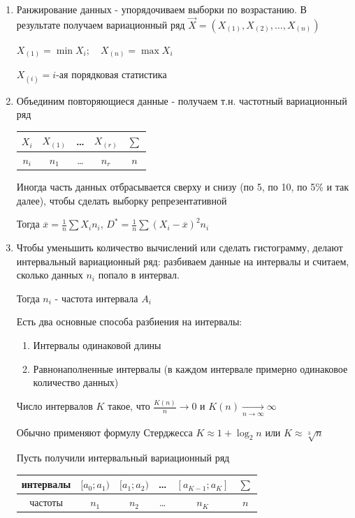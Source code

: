 \documentclass[12pt]{article}
\begin{document}
\begin{enumerate}
    \item Ранжирование данных - упорядочиваем выборки по возрастанию. В результате получаем вариационный ряд $\vec{X} = (X_{(1)}, X_{(2)}, \dots, X_{(n)})$

    $X_{(1)} = \min X_i; \quad X_{(n)} = \max X_i$

    $X_{(i)} = i$-ая порядковая статистика

    \item Объединим повторяющиеся данные - получаем т.н. частотный вариационный ряд

    \begin{tabular}{c|c|c|c|c}
        $X_i$ & $X_{(1)}$ & \dots & $X_{(r)}$ & $\sum$ \\ 
        \hline
        $n_i$ & $n_1$ & \dots & $n_r$ & $n$ \\ 
    \end{tabular}

    Иногда часть данных отбрасывается сверху и снизу (по 5, по 10, по 5\% и так далее), чтобы сделать выборку репрезентативной

    Тогда $\overline{x} = \frac{1}{n} \sum X_i n_i$, $D^* = \frac{1}{n} \sum (X_i - \overline{x})^2 n_i$
    
    \item Чтобы уменьшить количество вычислений или сделать гистограмму, делают интервальный вариационный ряд: 
    разбиваем данные на интервалы и считаем, сколько данных $n_i$ попало в интервал. 

    Тогда $n_i$ - частота интервала $A_i$

    Есть два основные способа разбиения на интервалы: 

    \begin{enumerate}
        \item Интервалы одинаковой длины
        \item Равнонаполненные интервалы (в каждом интервале примерно одинаковое количество данных)
    \end{enumerate}

    Число интервалов $K$ такое, что $\frac{K(n)}{n} \longrightarrow 0$ и $K(n) \underset{n \to \infty}{\longrightarrow} \infty$

    Обычно применяют формулу Стерджесса $K \approx 1 + \log_2 n$ или $K \approx \sqrt[3]{n}$

    Пусть получили интервальный вариационный ряд

    \begin{tabular}{c|c|c|c|c|c}
        интервалы & $[a_0; a_1)$ & $[a_1; a_2)$ & \dots & $[a_{K - 1}; a_K]$ & $\sum$ \\ 
        \hline
        частоты & $n_1$ & $n_2$ & \dots & $n_K$ & $n$ \\ 
    \end{tabular}

\end{enumerate}
\end{document}
